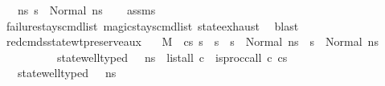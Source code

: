 \begin{isabellebody}
\ \ \ {\isachardoublequoteopen}{\isasymexists}ns{\isacharprime}{\kern0pt}{\isacharprime}{\kern0pt}{\isachardot}{\kern0pt}\ s{\isacharprime}{\kern0pt}{\isacharprime}{\kern0pt}\ {\isacharequal}{\kern0pt}\ Normal\ ns{\isacharprime}{\kern0pt}{\isacharprime}{\kern0pt}{\isachardoublequoteclose}\isanewline
%
\isadelimproof
\ \ %
\endisadelimproof
%
\isatagproof
{}\isamarkupfalse%
\ assms\isanewline
\ \ \isamarkupfalse%
\ failure{\isacharunderscore}{\kern0pt}stays{\isacharunderscore}{\kern0pt}cmd{\isacharunderscore}{\kern0pt}list\ magic{\isacharunderscore}{\kern0pt}stays{\isacharunderscore}{\kern0pt}cmd{\isacharunderscore}{\kern0pt}list\ state{\isachardot}{\kern0pt}exhaust\ \isamarkupfalse%
\ blast%
\endisatagproof
{\isafoldproof}%
%
\isadelimproof
\isanewline
%
\endisadelimproof
\isanewline
{}\isamarkupfalse%
\ red{\isacharunderscore}{\kern0pt}cmds{\isacharunderscore}{\kern0pt}state{\isacharunderscore}{\kern0pt}wt{\isacharunderscore}{\kern0pt}preserve{\isacharunderscore}{\kern0pt}aux{\isacharcolon}{\kern0pt}\isanewline
\ \ \ {\isachardoublequoteopen}M{\isacharcomma}{\kern0pt}{\isasymLambda}{\isacharcomma}{\kern0pt}{\isasymGamma}{\isacharcomma}{\kern0pt}{\isasymOmega}\ {\isasymturnstile}\ {\isasymlangle}cs{\isacharcomma}{\kern0pt}\ s{\isasymrangle}\ {\isacharbrackleft}{\kern0pt}{\isasymrightarrow}{\isacharbrackright}{\kern0pt}\ s{\isacharprime}{\kern0pt}{\isachardoublequoteclose}\ \ {\isachardoublequoteopen}s\ {\isacharequal}{\kern0pt}\ Normal\ ns{\isachardoublequoteclose}\ \ {\isachardoublequoteopen}s{\isacharprime}{\kern0pt}\ {\isacharequal}{\kern0pt}\ Normal\ ns{\isacharprime}{\kern0pt}{\isachardoublequoteclose}\ \isanewline
\ \ \ \ \ \ \ \ \ \ {\isachardoublequoteopen}state{\isacharunderscore}{\kern0pt}well{\isacharunderscore}{\kern0pt}typed\ {\isasymLambda}\ {\isasymOmega}\ ns{\isachardoublequoteclose}\ \ {\isachardoublequoteopen}list{\isacharunderscore}{\kern0pt}all\ {\isacharparenleft}{\kern0pt}{\isasymlambda}c{\isachardot}{\kern0pt}\ {\isasymnot}\ {\isacharparenleft}{\kern0pt}is{\isacharunderscore}{\kern0pt}proc{\isacharunderscore}{\kern0pt}call\ c{\isacharparenright}{\kern0pt}{\isacharparenright}{\kern0pt}\ cs{\isachardoublequoteclose}\isanewline
\ \ \ {\isachardoublequoteopen}state{\isacharunderscore}{\kern0pt}well{\isacharunderscore}{\kern0pt}typed\ {\isasymLambda}\ {\isasymOmega}\ ns{\isacharprime}{\kern0pt}{\isachardoublequoteclose}\isanewline

\end{isabellebody}
